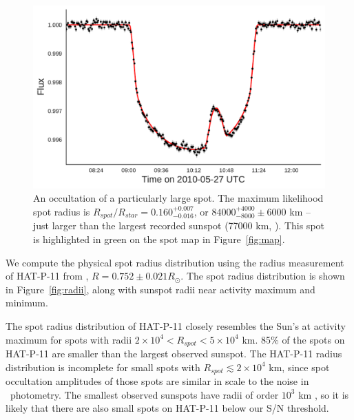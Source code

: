 \begin{figure}
\includegraphics[scale=0.45]{stsp_hat_p_11/lc_071.pdf}
\caption{An occultation of a particularly large spot. The maximum likelihood spot radius is $R_{spot}/R_{star} = 0.160_{-0.016}^{+0.007}$, or $84000^{+4000}_{-8000}\pm 6000$ km -- just larger than the largest recorded sunspot (77000 km, \citealt{Newton1955}). This spot is highlighted in green on the spot map in Figure~\ref{fig:map}.}
\label{fig:transit_071}
\end{figure}

We compute the physical spot radius distribution using the radius measurement of HAT-P-11 from \citet{Bakos2010}, $R=0.752 \pm 0.021 R_\odot$. The spot radius distribution is shown in Figure~\ref{fig:radii}, along with sunspot radii near activity maximum and minimum. 

The spot radius distribution of HAT-P-11 closely resembles the Sun's at activity maximum for spots with radii $2\times 10^4 < R_{spot} < 5 \times 10^4$ km. 85\% of the spots on HAT-P-11 are smaller than the largest observed sunspot. The HAT-P-11 radius distribution is incomplete for small spots with $R_{spot} \lesssim 2 \times 10^4$ km, since spot occultation amplitudes of those spots are similar in scale to the noise in \kepler\ photometry. The smallest observed sunspots have radii of order $10^3$ km \citep{Solanki2003}, so it is likely that there are also small spots on HAT-P-11 below our S/N threshold.

